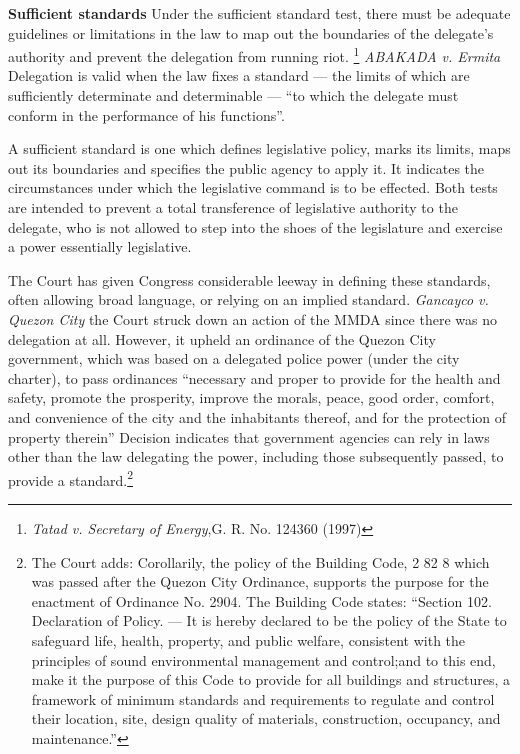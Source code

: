 \documentclass[../main.tex]{subfiles}
\begin{document}
\textbf{Sufficient standards}  Under the sufficient standard test, there must be adequate guidelines or limitations in the law to map out the boundaries of the delegate's authority and prevent the delegation from running riot. \footnote{\textit{Tatad v. Secretary of Energy},G. R. No. 124360 (1997)} \textit{ABAKADA v. Ermita}  Delegation is valid when the law fixes a standard — the limits of which are sufficiently determinate and determinable — \enquote{to which the delegate must conform in the performance of his functions}.

\begin{displayquote}
A sufficient standard is one which defines legislative policy, marks its limits, maps out its boundaries and specifies the public agency to apply it. It indicates the circumstances under which the legislative command is to be effected. Both tests are intended to prevent a total transference of legislative authority to the delegate, who is not allowed to step into the shoes of the legislature and exercise a power essentially legislative.
\end{displayquote}

The Court has given Congress considerable leeway in defining these standards, often allowing broad language, or relying on an implied standard. \textit{Gancayco v. Quezon City} the Court struck down an action of the MMDA since there was no delegation at all. However, it upheld an ordinance of the Quezon City government, which was based on a delegated police power (under the city charter), to pass ordinances ``necessary and proper to provide
for the health and safety, promote the prosperity, improve the morals, peace, good order, comfort, and convenience of the city and the inhabitants thereof, and for the protection of property therein'' Decision indicates that government agencies can rely in laws other than the law delegating the power, including those subsequently passed, to provide a standard.\footnote{The Court adds: Corollarily, the policy of the Building Code, 2 82 8 which was passed after the Quezon City Ordinance, supports the purpose for the enactment of Ordinance No. 2904. The Building Code states: ``Section 102. Declaration of Policy. — It is hereby declared to be the policy of the State to safeguard life, health, property, and public welfare, consistent with the principles of sound environmental management and control;and to this end, make it the purpose of this Code to provide for all buildings and structures, a framework of minimum standards and requirements to regulate and control their location, site, design quality of materials, construction, occupancy, and maintenance.''}
\end{document}
